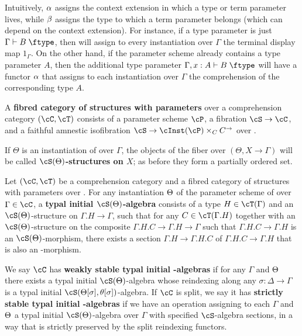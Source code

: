 \documentclass{amsart}
\let\S\cS
\let\P\cP
\let\C\cC
\let\T\cT
\let\type\fibtype
\begin{document}
Intuitively, $\alpha$ assigns the context extension in which a type or term parameter lives, while $\beta$ assigns the type to which a term parameter belongs (which can depend on the context extension).
For instance, if a type parameter is just $\Gamma\types B\type$, then \al will assign to every instantiation over $\Gamma$ the terminal display map $1_\Gamma$.
On the other hand, if the parameter scheme \P already contains a type parameter $A$, then the additional type parameter $\Gamma,x:A \types B\type$ will have a functor $\alpha$ that assigns to each instantiation over $\Gamma$ the comprehension of the corresponding type $A$.

\begin{defn}
  A \textbf{fibred category of structures with parameters} over a comprehension category $(\C,\T)$ consists of a parameter scheme $\P$, a fibration $\S\to \C$, and a faithful amnestic isofibration $\S \to \cInst(\P)\times_C C^\to$ over \C.
\end{defn}

If $\Theta$ is an instantiation of \P over $\Gamma$, the objects of the fiber over $(\Theta,X\to\Gamma)$ will be called \textbf{$\S(\Th)$-structures on $X$}; as before they form a partially ordered set.

\begin{defn}
  Let $(\C,\T)$ be a comprehension category and \S a fibred category of structures with parameters over \C.
  For any instantiation $\Theta$ of the parameter scheme of \S over $\Gamma\in \C$, a \textbf{typal initial $\S(\Th)$-algebra} consists of a type $H\in\T(\Gamma)$ and an $\S(\Th)$-structure on $\Gamma.H\to \Gamma$, such that for any $C\in\T(\Gamma.H)$ together with an $\S(\Th)$-structure on the composite $\Gamma.H.C\to\Gamma.H\to\Gamma$ such that $\Gamma.H.C\to\Gamma.H$ is an $\S(\Th)$-morphism, there exists a section $\Gamma.H \to \Gamma.H.C$ of $\Gamma.H.C\to\Gamma.H$ that is also an \S-morphism.

  We say $\C$ has \textbf{weakly stable typal initial \S-algebras} if for any $\Gamma$ and $\Theta$ there exists a typal initial $\S(\Th)$-algebra whose reindexing along any $\sigma:\Delta\to\Gamma$ is a typal initial $\S(\Theta[\sigma],\theta[\sigma])$-algebra.
  If $\C$ is split, we say it has \textbf{strictly stable typal initial \S-algebras} if we have an operation assigning to each $\Gamma$ and $\Theta$ a typal initial $\S(\Th)$-algebra over $\Gamma$ with specified $\S$-algebra sections, in a way that is strictly preserved by the split reindexing functors.
\end{defn}
\end{document}
